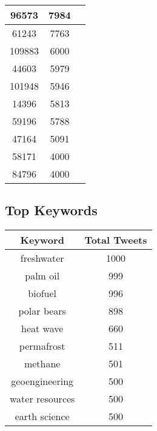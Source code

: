\documentclass{article}\usepackage[T1]{fontenc}
\begin{document}
\begin{tabular}{|c|c|c|}
 \hline
96573 & 7984\\ 
 \hline
61243 & 7763\\ 
 \hline
109883 & 6000\\ 
 \hline
44603 & 5979\\ 
 \hline
101948 & 5946\\ 
 \hline
14396 & 5813\\ 
 \hline
59196 & 5788\\ 
 \hline
47164 & 5091\\ 
 \hline
58171 & 4000\\ 
 \hline
84796 & 4000\\ 
 \hline
\end{tabular}\subsection*{Top Keywords}\begin{tabular}{|c|c|}         \hline         Keyword & Total Tweets \\ 
 \hline
freshwater & 1000\\ 
 \hline
palm oil & 999\\ 
 \hline
biofuel & 996\\ 
 \hline
polar bears & 898\\ 
 \hline
heat wave & 660\\ 
 \hline
permafrost & 511\\ 
 \hline
methane & 501\\ 
 \hline
geoengineering & 500\\ 
 \hline
water resources & 500\\ 
 \hline
earth science & 500\\ 
 \hline
\end{tabular}
\end{document}
